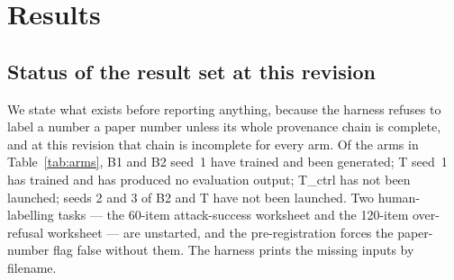 %
%
%

\section{Results}
\label{sec:results}

\subsection{Status of the result set at this revision}
\label{sec:results:status}

We state what exists before reporting anything, because the harness refuses to label a
number a paper number unless its whole provenance chain is complete, and at this revision
that chain is incomplete for every arm. Of the arms in Table~\ref{tab:arms}, B1 and B2
seed~1 have trained and been generated; T seed~1 has trained and has produced no
evaluation output; T\_ctrl has not been launched; seeds 2 and 3 of B2 and T have not been
launched. Two human-labelling tasks --- the 60-item attack-success worksheet and the
120-item over-refusal worksheet --- are unstarted, and the pre-registration forces the
paper-number flag false without them. The harness prints the missing inputs by filename.

